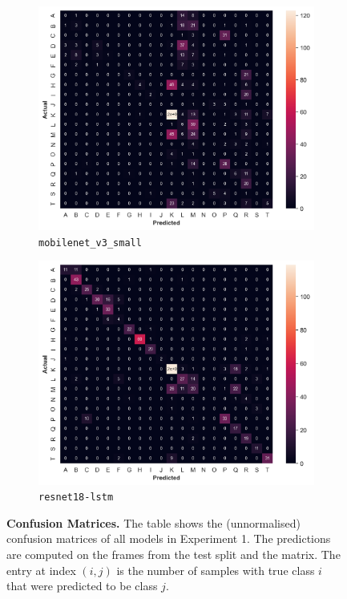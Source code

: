 \documentclass[a4paper]{article}
\begin{document}
\begin{figure}[b]
\begin{subfigure}{.33\textwidth}
    \end{subfigure}
    \begin{subfigure}{.33\textwidth}
        \centering
        \includegraphics[width=\textwidth]
        {figures/experiment1-conf-matrix-mobilenet_v3_small.png}
        \caption{\texttt{mobilenet\_v3\_small}}
    \end{subfigure}%
    \begin{subfigure}{.33\textwidth}
        \centering
        \includegraphics[width=\textwidth]
        {figures/experiment1-conf-matrix-resnet18-lstm.png}
        \caption{\texttt{resnet18-lstm}}
    \end{subfigure}%

    \caption{
      \textbf{Confusion Matrices.} The table shows the (unnormalised) confusion
      matrices of all models in Experiment 1. The predictions are computed on
      the frames from the test split and the matrix. The entry at index $(i,j)$
      is the number of samples with true class $i$ that were predicted to be
      class $j$.
    }

    \label{fig:conf-matrices-experiment1}
  \end{figure}
\end{document}
